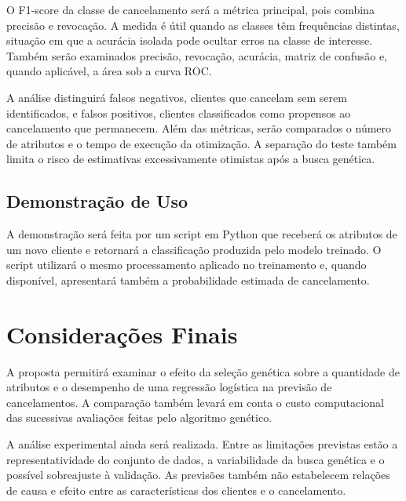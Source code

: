 \documentclass[12pt]{article}
\begin{document}
O F1-score da classe de cancelamento será a métrica principal, pois combina
precisão e revocação. A medida é útil quando as classes têm frequências
distintas, situação em que a acurácia isolada pode ocultar erros na classe de
interesse. Também serão examinados precisão, revocação, acurácia, matriz de
confusão e, quando
aplicável, a área sob a curva ROC.

A análise distinguirá falsos negativos, clientes que cancelam sem serem
identificados, e falsos positivos, clientes classificados como propensos ao
cancelamento que permanecem. Além das métricas, serão comparados o número de
atributos e o tempo de execução da otimização. A separação do teste também limita o risco de estimativas excessivamente
otimistas após a busca genética.

\subsection{Demonstração de Uso}

A demonstração será feita por um script em Python que receberá os atributos
de um novo cliente e retornará a classificação produzida pelo modelo treinado.
O script utilizará o mesmo processamento aplicado no treinamento e, quando
disponível, apresentará também a probabilidade estimada de cancelamento.

\section{Considerações Finais}

A proposta permitirá examinar o efeito da seleção genética sobre a quantidade
de atributos e o desempenho de uma regressão logística na previsão de
cancelamentos. A comparação também levará em conta o
custo computacional das sucessivas avaliações feitas pelo algoritmo genético.

A análise experimental ainda será realizada. Entre as limitações previstas
estão a representatividade do conjunto de dados, a variabilidade da busca
genética e o possível sobreajuste à validação. As previsões também não
estabelecem relações de causa e efeito entre as características dos clientes
e o cancelamento.



\end{document}

